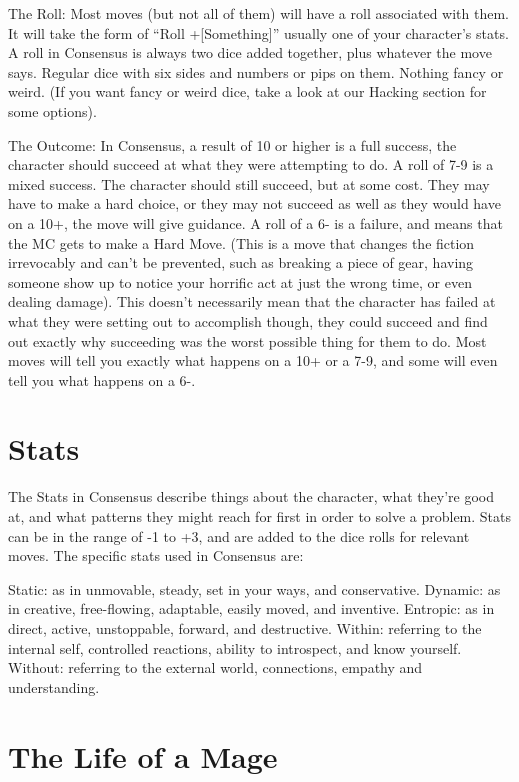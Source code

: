 \documentclass[10pt,twoside,openright]{memoir}
\begin{document}
The Roll: Most moves (but not all of them) will have a roll associated
with them. It will take the form of ``Roll +{[}Something{]}'' usually
one of your character's stats. A roll in Consensus is always two dice
added together, plus whatever the move says. Regular dice with six sides
and numbers or pips on them. Nothing fancy or weird. (If you want fancy
or weird dice, take a look at our Hacking section for some options).

The Outcome: In Consensus, a result of 10 or higher is a full success,
the character should succeed at what they were attempting to do. A roll
of 7-9 is a mixed success. The character should still succeed, but at
some cost. They may have to make a hard choice, or they may not succeed
as well as they would have on a 10+, the move will give guidance. A roll
of a 6- is a failure, and means that the MC gets to make a Hard Move.
(This is a move that changes the fiction irrevocably and can't be
prevented, such as breaking a piece of gear, having someone show up to
notice your horrific act at just the wrong time, or even dealing
damage). This doesn't necessarily mean that the character has failed at
what they were setting out to accomplish though, they could succeed and
find out exactly why succeeding was the worst possible thing for them to
do. Most moves will tell you exactly what happens on a 10+ or a 7-9, and
some will even tell you what happens on a 6-.

\hypertarget{stats}{%
\section{Stats}\label{stats}}

The Stats in Consensus describe things about the character, what they're
good at, and what patterns they might reach for first in order to solve
a problem. Stats can be in the range of -1 to +3, and are added to the
dice rolls for relevant moves. The specific stats used in Consensus are:

Static: as in unmovable, steady, set in your ways, and conservative.
Dynamic: as in creative, free-flowing, adaptable, easily moved, and
inventive. Entropic: as in direct, active, unstoppable, forward, and
destructive. Within: referring to the internal self, controlled
reactions, ability to introspect, and know yourself. Without: referring
to the external world, connections, empathy and understanding.

\hypertarget{the-life-of-a-mage}{%
\section{The Life of a Mage}\label{the-life-of-a-mage}}
\end{document}
